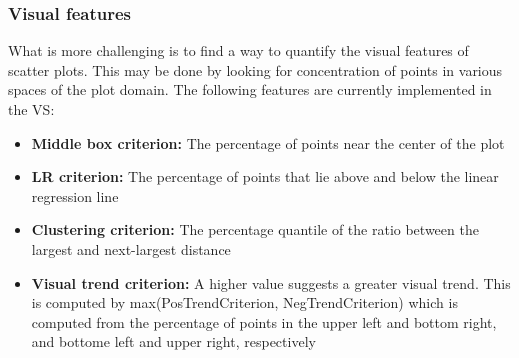 \subsubsection{Visual features}

What is more challenging is to find a way to quantify the visual features of 
scatter plots. This may be done by looking for concentration of points in 
various spaces of the plot domain. The following features are currently 
implemented in the VS: 

\tablespacing
\begin{itemize}
	\item \textbf{Middle box criterion:} The percentage of points near the 
	center of the plot
	\item \textbf{LR criterion:} The percentage of points that lie above and 
	below the linear regression line
	\item \textbf{Clustering criterion:} The percentage quantile of the ratio 
	between the largest and next-largest distance
	\item \textbf{Visual trend criterion:} A higher value suggests a greater 
	visual trend. This is computed by max(PosTrendCriterion, NegTrendCriterion) 
	which is computed from the percentage of points in the upper left and 
	bottom right, and bottome left and upper right, respectively
\end{itemize}
\bodyspacing